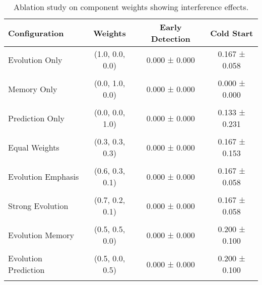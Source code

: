 \begin{table}[htbp]
\centering
\caption{Ablation study on component weights showing interference effects.}
\label{tab:ablation}
\begin{tabular}{lccc}
\toprule
\textbf{Configuration} & \textbf{Weights} & \textbf{Early Detection} & \textbf{Cold Start} \\
\midrule
Evolution Only & (1.0, 0.0, 0.0) & 0.000 ± 0.000 & 0.167 ± 0.058 \\\\
Memory Only & (0.0, 1.0, 0.0) & 0.000 ± 0.000 & 0.000 ± 0.000 \\\\
Prediction Only & (0.0, 0.0, 1.0) & 0.000 ± 0.000 & 0.133 ± 0.231 \\\\
Equal Weights & (0.3, 0.3, 0.3) & 0.000 ± 0.000 & 0.167 ± 0.153 \\\\
Evolution Emphasis & (0.6, 0.3, 0.1) & 0.000 ± 0.000 & 0.167 ± 0.058 \\\\
Strong Evolution & (0.7, 0.2, 0.1) & 0.000 ± 0.000 & 0.167 ± 0.058 \\\\
Evolution Memory & (0.5, 0.5, 0.0) & 0.000 ± 0.000 & 0.200 ± 0.100 \\\\
Evolution Prediction & (0.5, 0.0, 0.5) & 0.000 ± 0.000 & 0.200 ± 0.100 \\\\
\bottomrule
\end{tabular}
\end{table}
